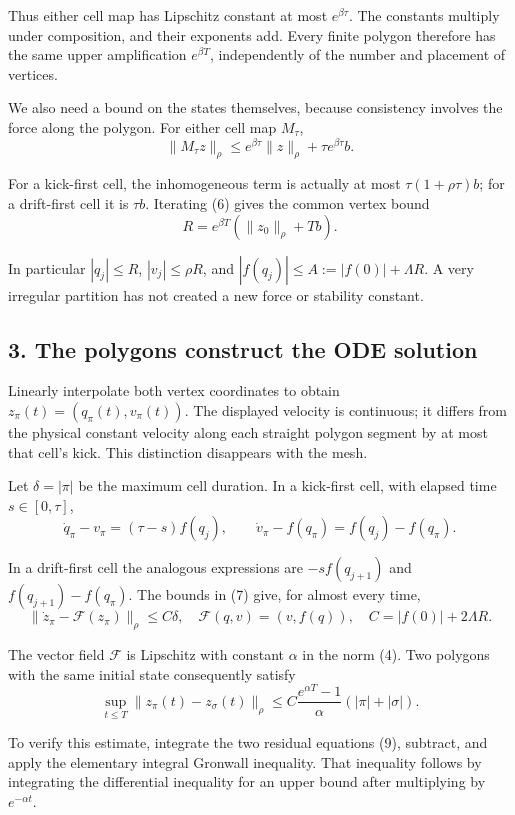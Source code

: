 \documentclass[11pt,a4paper]{article}
\begin{document}
Thus either cell map has Lipschitz constant at most \(e^{\beta\tau}\).
The constants multiply under composition, and their exponents add. Every
finite polygon therefore has the same upper amplification
\(e^{\beta T}\), independently of the number and placement of vertices.

We also need a bound on the states themselves, because consistency
involves the force along the polygon. For either cell map \(M_\tau\), \[
 \|M_\tau z\|_\rho\le e^{\beta\tau}\|z\|_\rho
                         +\tau e^{\beta\tau}b.
 \tag{6}
\]

For a kick-first cell, the inhomogeneous term is actually at most
\(\tau(1+\rho\tau)b\); for a drift-first cell it is \(\tau b\).
Iterating (6) gives the common vertex bound
\[R=e^{\beta T}(\|z_0\|_\rho+Tb).\tag{7}\]

In particular \(|q_j|\le R\), \(|v_j|\le\rho R\), and
\(|f(q_j)|\le A:=|f(0)|+\Lambda R\). A very irregular partition has not
created a new force or stability constant.

\subsection{3. The polygons construct the ODE
solution}\label{the-polygons-construct-the-ode-solution}

Linearly interpolate both vertex coordinates to obtain
\(z_\pi(t)=(q_\pi(t),v_\pi(t))\). The displayed velocity is continuous;
it differs from the physical constant velocity along each straight
polygon segment by at most that cell's kick. This distinction disappears
with the mesh.

Let \(\delta=|\pi|\) be the maximum cell duration. In a kick-first cell,
with elapsed time \(s\in[0,\tau]\), \[
 \dot q_\pi-v_\pi=(\tau-s)f(q_j),\qquad
 \dot v_\pi-f(q_\pi)=f(q_j)-f(q_\pi).
 \tag{8}
\]

In a drift-first cell the analogous expressions are \(-sf(q_{j+1})\) and
\(f(q_{j+1})-f(q_\pi)\). The bounds in (7) give, for almost every time,
\[
 \|\dot z_\pi-\mathcal F(z_\pi)\|_\rho\le C\delta,
 \quad\mathcal F(q,v)=(v,f(q)),\quad C=|f(0)|+2\Lambda R.
 \tag{9}
\]

The vector field \(\mathcal F\) is Lipschitz with constant \(\alpha\) in
the norm (4). Two polygons with the same initial state consequently
satisfy \[
 \sup_{t\le T}\|z_\pi(t)-z_\sigma(t)\|_\rho
 \le C\frac{e^{\alpha T}-1}{\alpha}
                        (|\pi|+|\sigma|).
 \tag{10}
\]

To verify this estimate, integrate the two residual equations (9),
subtract, and apply the elementary integral Gronwall inequality. That
inequality follows by integrating the differential inequality for an
upper bound after multiplying by \(e^{-\alpha t}\).
\end{document}
